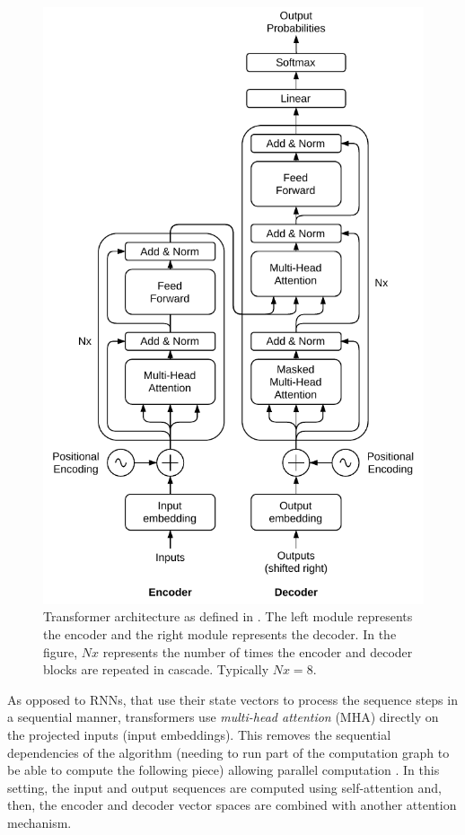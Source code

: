 \begin{figure}
	\centering
	\includegraphics[width=0.8\linewidth]{background/images/transformer}
	\caption[Transformer architecture]{Transformer architecture as defined in \autocite{vaswani2017}. The left module represents the encoder and the right module represents the decoder. In the figure, $Nx$ represents the number of times the encoder and decoder blocks are repeated in cascade. Typically $Nx=8$. }
	\label{fig:transformer}
\end{figure}

As opposed to RNNs, that use their state vectors to process the sequence steps in a sequential manner, transformers use \textit{multi-head attention} (MHA) directly on the projected inputs (input embeddings). This removes the sequential dependencies of the algorithm (needing to run part of the computation graph to be able to compute the following piece) allowing parallel computation \autocite{uday2019}. In this setting, the input and output sequences are computed using self-attention and, then, the encoder and decoder vector spaces are combined with another attention mechanism.

